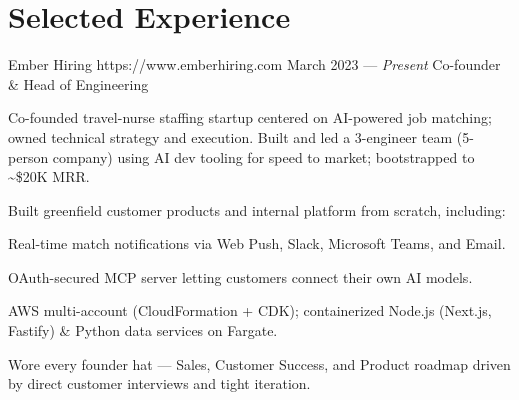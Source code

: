 \documentclass{resume}
\begin{document}
\smallskip

\section{Selected Experience}

\employer
{Ember Hiring}
{https://www.emberhiring.com}
{March 2023 --- \emph{Present}}
{Co-founder \& Head of Engineering}
{
  \begin{jobitems}
  \item Co-founded travel-nurse staffing startup centered on AI-powered job matching; owned technical strategy and execution. Built and led a 3-engineer team (5-person company) using AI dev tooling for speed to market; bootstrapped to \textasciitilde\$20K MRR.
  \item Built greenfield customer products and internal platform from scratch, including:
    \begin{jobitems}
    \item Real-time match notifications via Web Push, Slack, Microsoft Teams, and Email.
    \item OAuth-secured MCP server letting customers connect their own AI models.
    \item AWS multi-account (CloudFormation + CDK); containerized Node.js (Next.js, Fastify) \& Python data services on Fargate.
    \end{jobitems}
  \item Wore every founder hat --- Sales, Customer Success, and Product roadmap driven by direct customer interviews and tight iteration.
\end{jobitems}}
\end{document}
